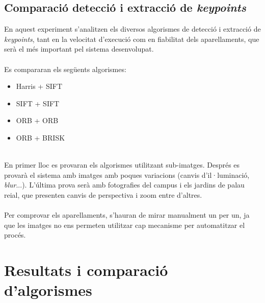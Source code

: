 	\subsection{Comparació detecció i extracció de \textit{keypoints}}
		En aquest experiment s'analitzen els diversos algorismes de detecció i extracció de \textit{keypoints}, tant en la velocitat d'execució com en fiabilitat dels aparellaments, que serà el més important
		pel sistema desenvolupat.\\\\
		Es compararan els següents algorismes:
		\begin{multicols}{2} 
			\begin{itemize}
				\item{Harris + SIFT}
				\item{SIFT + SIFT}
				\item{ORB + ORB}
				\item{ORB + BRISK}
			\end{itemize}
		\end{multicols}
		\noindent
		\\{}
		En primer lloc es provaran els algorismes utilitzant sub-imatges. Després es provarà el sistema amb imatges amb poques variacions (canvis d'il·luminació, \textit{blur}...). L'última prova serà amb fotografies
		del campus i els jardins de palau reial, que presenten canvis de perspectiva i zoom entre d'altres.\\\\
		Per comprovar els aparellaments, s'hauran de mirar manualment un per un, ja que les imatges no ens permeten utilitzar cap mecanisme per automatitzar el procés.
\newpage
\section{Resultats i comparació d'algorismes}

